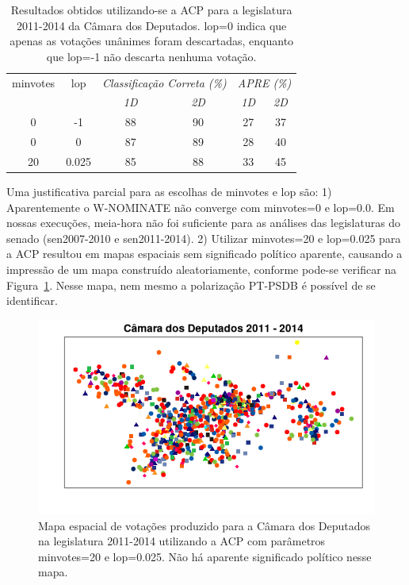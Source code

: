 \documentclass[a4paper, 12pt]{article}
\newcommand\wnominate{W-NOMINATE\xspace}
\begin{document}
\begin{table}
\centering
\begin{tabular}{c c c c c c}
\textsf{minvotes} & \textsf{lop} & \multicolumn{2}{c}{\itshape Classificação Correta (\%)} & \multicolumn{2}{c}{\itshape APRE (\%)} \\
 & & \itshape 1D & \itshape 2D & \itshape 1D & \itshape 2D \\
\hline
0 & -1     & 88 & 90 & 27 & 37 \\
0 &  0     & 87 & 89 & 28 & 40\\
20 & 0.025 & 85 & 88 & 33 & 45\\
\end{tabular} 
\caption{Resultados obtidos utilizando-se a ACP para a legislatura 2011-2014 da Câmara dos Deputados. \textsf{lop=0} indica que apenas as votações unânimes foram descartadas, enquanto que \textsf{lop=-1} não descarta nenhuma votação.}
\label{tab:variando-lop}
\end{table}

Uma justificativa parcial para as escolhas de \textsf{minvotes} e \textsf{lop} são: 1) Aparentemente o \wnominate não converge com \textsf{minvotes=0} e \textsf{lop=0.0}. Em nossas execuções, meia-hora não foi suficiente para as análises das legislaturas do senado (sen2007-2010 e sen2011-2014). 2) Utilizar \textsf{minvotes=20} e \textsf{lop=0.025} para a ACP resultou em mapas espaciais sem significado político aparente, causando a impressão de um mapa construído aleatoriamente, conforme pode-se verificar na Figura~\ref{fig:mapa-ruim}. Nesse mapa, nem mesmo a polarização PT-PSDB é possível de se identificar.

\begin{figure}[h!]
  \centering
  \includegraphics[scale=0.7]{figs/mapa-ruim.png}
  \caption{Mapa espacial de votações produzido para a Câmara dos Deputados na legislatura 2011-2014 utilizando a ACP com parâmetros \textsf{minvotes=20} e \textsf{lop=0.025}. Não há aparente significado político nesse mapa.}
  \label{fig:mapa-ruim}
\end{figure}
\end{document}
